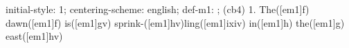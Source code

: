 initial-style: 1;
centering-scheme: english;
def-m1: \grealign;
(cb4) 1. The([em1]f) dawn([em1]f) is([em1]gv) sprink-([em1]hv)ling([em1]ixiv) in([em1]h) the([em1]g) east([em1]hv)